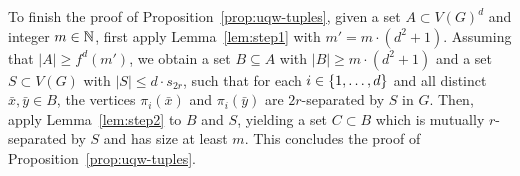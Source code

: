 \begin{comment}
\begin{proof}
  We construct a sequence $C_0\subset C_1\subset \ldots$ of subsets of
  $B$ which are mutually $r$-independent in $G-S$, as follows.

  We start with $C_0=\emptyset$. Suppose that $C_s\subset B$ is
  already constructed for some $s\ge 0$ and is mutually
  $r$-independent in $G-S$; we construct $C_{s+1}$. With each element
  $a\in B-C_s$, we associate an arbitrarily chosen function
  $f_a\colon \set{1,\ldots,d}^2\to C_s\cup \set{\bot}$ with the
  following properties:
  \begin{itemize}
  \item If $f_a(i,j)=b$ then the $i$th coordinate of $a$ and the $j$th
    coordinate of $b$ are not $r$-separated by $S$.
  \item If $f_a(i,j)=\bot$ then there is no element $b\in C_s$ such
    that the $i$th coordinate of $a$ and the $j$th coordinate of $b$
    are at not $r$-separated by $S$.
  \end{itemize}
  Observe that whenever $a_1, a_2$ are two distinct elements of
  $B-C_s$, then for all $i,j\in \set{1,\ldots,d}^2$, the values
  $f_{a_1}(i,j)$ and $f_{a_2}(i,j)$ cannot be equal to the same
  element $b\in C_s$: otherwise, we would have that the $i$th
  coordinate of $a_1$ and the $i$th coordinate of $a_2$ are not
  $2r$-separated by $S$, which is impossible by the assumption on $B$.
  In particular, if $|B-C_s|> |C_s|\cdot d^2$ then there must be some
  element $a\in B-C_s$ such that $f_a(i,j)=\bot$ for all
  $i,j\in\set{1,\ldots,d}$.  Let $C_{s+1}=C_s\cup \set a$.  By
  construction, $C_{s+1}$ is mutually $r$-independent in $G-S$.

  We may repeat the construction as long as
  $|B|>|C_s|\cdot (d^2+1)=s\cdot (d^2+1)$, and we stop when this
  inequality no longer holds. Define the set $C$ as the last
  constructed set $C_s$.  By construction,
  $|C_s|=s\ge \frac{|B|}{d^2+1}$.
\end{proof}
\end{comment}

To finish the proof of Proposition~\ref{prop:uqw-tuples}, given a set
$A\subset V(G)^d$ and integer $m\in\mathbb{N}$, first apply
Lemma~\ref{lem:step1} with $m'= m\cdot (d^2+1)$.  Assuming that
$|A|\ge f^d(m')$, we obtain a set $B\subseteq A$ with
$|B|\ge m\cdot (d^2+1)$ and a set $S\subset V(G)$ with
$|S|\le d\cdot s_{2r}$, such that for each $i\in \{1,\ldots,d\}$ and
all distinct $\bar{x},\bar{y}\in B$, the vertices $\pi_i(\bar{x})$ and
$\pi_i(\bar{y})$ are $2r$-separated by $S$ in $G$.  Then, apply
Lemma~\ref{lem:step2} to $B$ and $S$, yielding a set $C\subset B$
which is mutually $r$-separated by $S$ and has size at least $m$.
This concludes the proof of Proposition~\ref{prop:uqw-tuples}.


